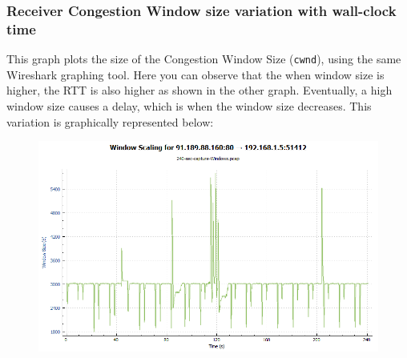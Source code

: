 \documentclass{article}
\begin{document}
\subsubsection{Receiver Congestion Window size variation with wall-clock time}
\begin{flushleft}
This graph plots the size of the Congestion Window Size (\texttt{cwnd}), using the same Wireshark graphing tool. Here you can observe that the when window size is higher, the RTT is also higher as shown in the other graph. Eventually, a high window size causes a delay, which is when the window size decreases. This variation is graphically represented below:
\begin{figure}[H]
\centering
\includegraphics[width=0.55\linewidth]{Window-size-variation-240-sec-capture-Windows.png}
\end{figure}
\end{flushleft}
\end{document}

